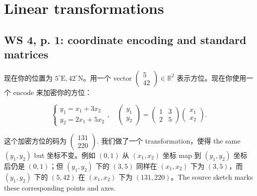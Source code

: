\chapter{Linear transformations}

\section{WS 4, p. 1: coordinate encoding and standard matrices}

现在你的位置为 \(5^{\circ}\text{E},42^{\circ}\text{N}\)。用一个 vector \(\begin{pmatrix}
5 \\
42
\end{pmatrix} \in \mathbb{R}^{2}\) 表示方位。现在你使用一个 encode 来加密你的方位：

\[\left\{ \begin{matrix}
{y_{1} = x_{1} + 3x_{2}} \\
{y_{2} = 2x_{1} + 5x_{2}}
\end{matrix} \right.,\quad\begin{pmatrix}
y_{1} \\
y_{2}
\end{pmatrix} = \begin{pmatrix}
1 & 3 \\
2 & 5
\end{pmatrix}\begin{pmatrix}
x_{1} \\
x_{2}
\end{pmatrix}.\]

这个加密方位的码为 \(\begin{pmatrix}
131 \\
220
\end{pmatrix}\). 我们做了一个 transformation，使得 the same \(\left( {y_{1},y_{2}} \right)\) but 坐标不变。例如 \(\left( {0,1} \right)\) 从 \(\left( {x_{1},x_{2}} \right)\) 坐标 map 到 \(\left( {y_{1},y_{2}} \right)\) 坐标后仍是 \(\left( {0,1} \right)\)；但 \(\left( {y_{1},y_{2}} \right)\) 下的 \(\left( {3,5} \right)\) 同样在 \(\left( {x_{1},x_{2}} \right)\) 下为 \(\left( {3,5} \right)\)，而 \(\left( {y_{1},y_{2}} \right)\) 下的 \(\left( {5,42} \right)\) 在 \(\left( {x_{1},x_{2}} \right)\) 下为 \(\left( {131,220} \right)\)。The source sketch marks these corresponding points and axes.

